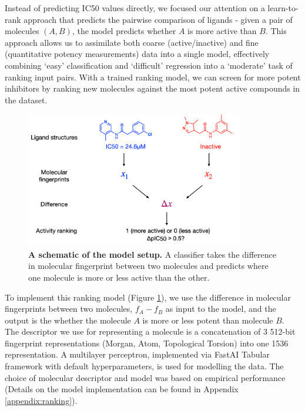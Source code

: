 Instead of predicting IC50 values directly, we focused our attention on a learn-to-rank approach \cite{duffy2010molecular,agarwal2010ranking} that predicts the pairwise comparison of ligands - given a pair of molecules $(A,B)$, the model predicts whether $A$ is more active than $B$. This approach allows us to assimilate both coarse (active/inactive) and fine (quantitative potency measurements) data into a single model, effectively combining `easy' classification and `difficult' regression into a `moderate' task of ranking input pairs. With a trained ranking model, we can screen for more potent inhibitors by ranking new molecules against the most potent active compounds in the dataset.

\begin{figure}[!th]
    \centering
    \includegraphics[width=0.85\textwidth]{Chapters/Ranking/Figs/schematic.png}
    \caption{\textbf{A schematic of the model setup.} A classifier takes the difference in molecular fingerprint between two molecules and predicts where one molecule is more or less active than the other.}
    \label{fig:ranking_schematic}
\end{figure}

To implement this ranking model (Figure \ref{fig:ranking_schematic}), we use the difference in molecular fingerprints between two molecules, $f_A - f_B$ as input to the model, and the output is the whether the molecule $A$ is more or less potent than molecule $B$. The descriptor we use for representing a molecule is a concatenation of 3 512-bit fingerprint representations (Morgan, Atom, Topological Torsion) into one 1536 representation. A multilayer perceptron, implemented via FastAI Tabular framework \cite{howard2018fastai} with default hyperparameters, is used for modelling the data. The choice of molecular descriptor and model was based on empirical performance (Details on the model implementation can be found in Appendix \ref{appendix:ranking}). %


